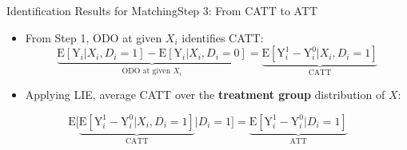 \documentclass[dvipsnames,hyperref={pdfpagelabels=false}]{beamer}
\begin{document}
\begin{frame}{Identification Results for Matching}{Step 3: From CATT to ATT}
	\begin{itemize}
		
		\item From Step 1, ODO at given $X_i$ identifies CATT:
		\begin{equation*}
			\underbrace{\mathrm{E}[\mathrm{Y}_{i}|X_{i},D_{i}=1] - \mathrm{E}[\mathrm{Y}_{i}|X_{i},D_{i}=0]}_{\text{ODO at given } X_{i}}  = \underbrace{\mathrm{E}[\mathrm{Y}^{1}_{i}-\mathrm{Y}^{0}_{i}|X_{i},D_i=1]}_{\text{CATT}}
		\end{equation*}	
		
		\item Applying LIE, average CATT over the \textbf{treatment group} distribution of $X$:
		
	\end{itemize}
	\begin{equation*}
		\mathrm{E}\Big[\underbrace{\mathrm{E}[\mathrm{Y}^{1}_{i}-\mathrm{Y}^{0}_{i}|X_{i},D_i=1]}_{\text{CATT}}\Big| D_i=1\Big] 
		=\underbrace{\mathrm{E}[\mathrm{Y}^{1}_{i}-\mathrm{Y}^{0}_{i}|D_i=1]}_{\text{ATT}}
	\end{equation*}	
	
\end{frame}


\end{document}
